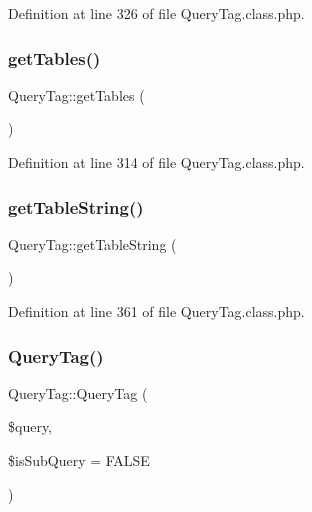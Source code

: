 Definition at line 326 of file Query\+Tag.\+class.\+php.

\mbox{\label{classQueryTag_a016b987e8e488622f64a89b40de7109f}} 
\subsubsection{\texorpdfstring{get\+Tables()}{getTables()}}
{\footnotesize\ttfamily Query\+Tag\+::get\+Tables (\begin{DoxyParamCaption}{ }\end{DoxyParamCaption})}



Definition at line 314 of file Query\+Tag.\+class.\+php.

\mbox{\label{classQueryTag_a62814037e62c4b29f53f6b9a9d677e17}} 
\subsubsection{\texorpdfstring{get\+Table\+String()}{getTableString()}}
{\footnotesize\ttfamily Query\+Tag\+::get\+Table\+String (\begin{DoxyParamCaption}{ }\end{DoxyParamCaption})}



Definition at line 361 of file Query\+Tag.\+class.\+php.

\mbox{\label{classQueryTag_a1f7df91f1227af5dabcdcc10abe88989}} 
\subsubsection{\texorpdfstring{Query\+Tag()}{QueryTag()}}
{\footnotesize\ttfamily Query\+Tag\+::\+Query\+Tag (\begin{DoxyParamCaption}\item[{}]{\$query,  }\item[{}]{\$is\+Sub\+Query = {\ttfamily FALSE} }\end{DoxyParamCaption})}


